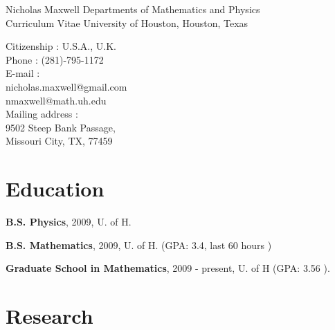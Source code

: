 \documentclass[letterpaper]{article}
\begin{document}
\vspace{0.25in}

\begin{flushleft}
Nicholas Maxwell \hfill Departments of Mathematics and Physics \\
Curriculum Vitae \hfill  University of Houston, Houston, Texas \\
\hrulefill
\end{flushleft}

\begin{flushleft}
Citizenship : U.S.A., U.K.\\
Phone : (281)-795-1172\\
E-mail : \\
\hspace{0.25in} nicholas.maxwell@gmail.com\\
\hspace{0.25in} nmaxwell@math.uh.edu\\
Mailing address : \\
\hspace{0.25in} 9502 Steep Bank Passage,\\
\hspace{0.25in} Missouri City, TX, 77459
\end{flushleft}

\section*{Education}

\begin{flushleft}
\hspace{0.25in} {\bf B.S. Physics}, 2009, U. of H.\\
\end{flushleft}
\begin{flushleft}
\hspace{0.25in} {\bf B.S. Mathematics}, 2009, U. of H. (GPA: 3.4, last 60 hours )
\end{flushleft}
\begin{flushleft}
\hspace{0.25in} {\bf Graduate School in Mathematics}, 2009 - present, U. of H  (GPA: 3.56     ).
\end{flushleft}

\section*{Research}
\end{document}
